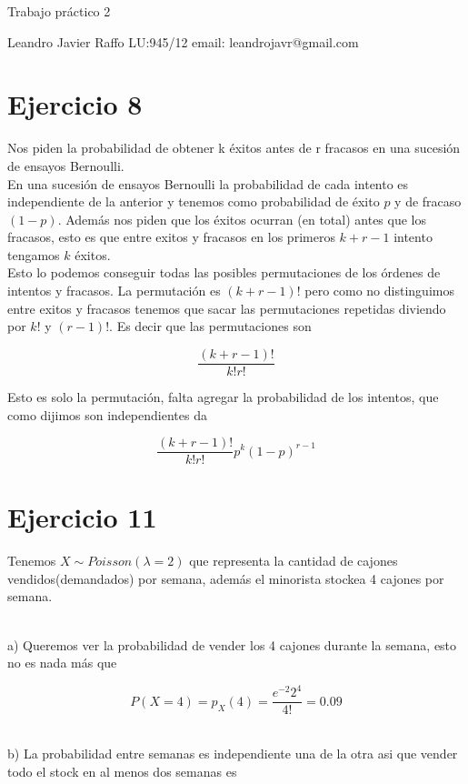 \documentclass[leqno, 12pt, twoside, letterpaper]{book}
\date{\vspace{-5ex}}
\begin{document}
\bigskip

\centerline {\Large Trabajo práctico 2}
\centerline {Leandro Javier Raffo LU:945/12 \quad  email: leandrojavr@gmail.com}

\section*{Ejercicio 8}
\noindent Nos piden la probabilidad de obtener k éxitos antes de r fracasos en una
sucesión de ensayos Bernoulli.\\

\noindent En una sucesión de ensayos Bernoulli la probabilidad de cada intento
es independiente de la anterior y tenemos como probabilidad de éxito $p$ y de
fracaso $(1 -p)$. Además nos piden que los éxitos ocurran (en total) antes que
los fracasos, esto es que entre exitos y fracasos en los primeros $k + r - 1$
intento tengamos $k$ éxitos. \\

\noindent Esto lo podemos conseguir todas las posibles
permutaciones de los órdenes de intentos y fracasos. La permutación es $(k + r -
1)!$ pero como no distinguimos entre exitos y fracasos tenemos que sacar las
permutaciones repetidas diviendo por $k!$ y $(r - 1)!$. Es decir que las
permutaciones son

$$ \dfrac{(k + r - 1)!}{k! r!} $$

\noindent Esto es solo la permutación, falta agregar la probabilidad de los intentos, que
como dijimos son independientes da

$$ \dfrac{(k + r - 1)!}{k! r!} p^k (1-p)^{r-1}$$


\section*{Ejercicio 11}

Tenemos $X \sim Poisson(\lambda = 2)$ que representa la cantidad de cajones
vendidos(demandados) por semana, además el minorista stockea 4 cajones por
semana.

\hfill\\
a) Queremos ver la probabilidad de vender los 4 cajones durante la semana, esto
no es nada más que

$$P(X = 4) = p_X(4) = \dfrac{e^{-2} 2^4}{4!} = 0.09$$

\hfill\\
b) La probabilidad entre semanas es independiente una de la otra asi que vender
todo el stock en al menos dos semanas es
\end{document}
